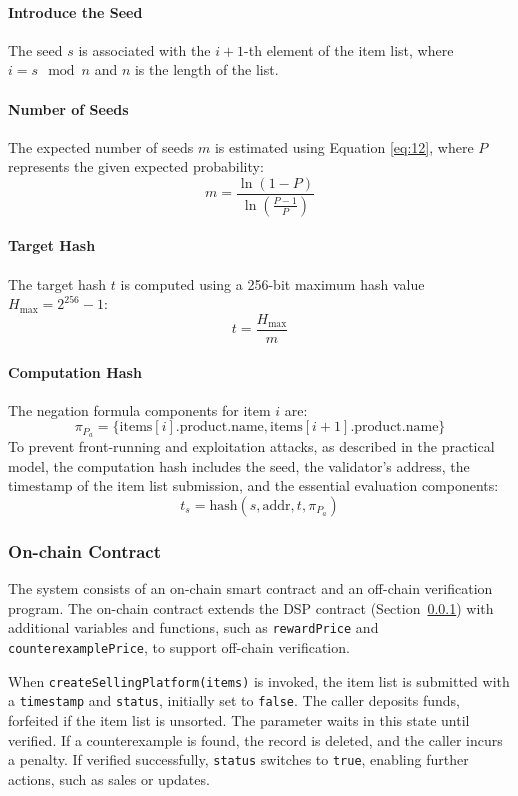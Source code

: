 \documentclass[runningheads]{llncs}
\begin{document}
\paragraph{Introduce the Seed}
The seed \( s \) is associated with the \( i+1 \)-th element of the item list, where \( i = s \mod n \) and \( n \) is the length of the list.

\paragraph{Number of Seeds}
The expected number of seeds \( m \) is estimated using Equation \ref{eq:12}, where \( P \) represents the given expected probability:
\[
m = \frac{\ln(1 - P)}{\ln\left( \frac{P - 1}{P} \right)}
\]

\paragraph{Target Hash}
The target hash \( t \) is computed using a 256-bit maximum hash value \( H_{\text{max}} = 2^{256} - 1 \):
\[
t = \frac{H_{\text{max}}}{m}
\]

\paragraph{Computation Hash}
The negation formula components for item \( i \) are:
\[
\pi_{P_{a}} = \{ \text{items}[i].\text{product.name}, \text{items}[i+1].\text{product.name} \}
\]
To prevent front-running and exploitation attacks, as described in the practical model, the computation hash includes the seed, the validator's address, the timestamp of the item list submission, and the essential evaluation components:
\[
t_s = \text{hash}(s, \text{addr}, t, \pi_{P_{a}})
\]
\subsubsection{On-chain Contract}
The system consists of an on-chain smart contract and an off-chain verification program. The on-chain contract extends the DSP contract (Section~\ref{}) with additional variables and functions, such as \texttt{rewardPrice} and \texttt{counterexamplePrice}, to support off-chain verification.

When \texttt{createSellingPlatform(items)} is invoked, the item list is submitted with a \texttt{timestamp} and \texttt{status}, initially set to \texttt{false}. The caller deposits funds, forfeited if the item list is unsorted. The parameter waits in this state until verified. If a counterexample is found, the record is deleted, and the caller incurs a penalty. If verified successfully, \texttt{status} switches to \texttt{true}, enabling further actions, such as sales or updates.
\end{document}
